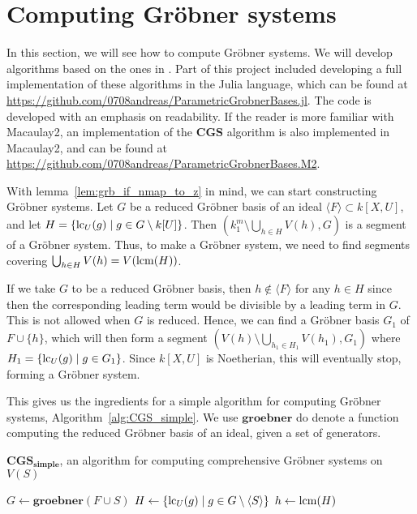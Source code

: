 \section{Computing Gröbner systems}
In this section, we will see how to compute Gröbner systems. We will develop algorithms based on the ones in \cite{ss_algo}. Part of this project included developing a full implementation of these algorithms in the Julia language, which can be found at \url{https://github.com/0708andreas/ParametricGrobnerBases.jl}. The code is developed with an emphasis on readability. If the reader is more familiar with Macaulay2, an implementation of the $\mathbf{CGS}$ algorithm is also implemented in Macaulay2, and can be found at \url{https://github.com/0708andreas/ParametricGrobnerBases.M2}.

With lemma~\ref{lem:grb_if_nmap_to_z} in mind, we can start constructing Gröbner systems. Let $G$ be a reduced Gröbner basis of an ideal $\langle F \rangle \subset k[X, U]$, and let $H = \{\operatorname{lc}_{U}(g) \mid g \in G \setminus k[U]\}$. Then $\left(k_{1}^{m} \setminus \bigcup_{h \in H} V(h), G\right)$ is a segment of a Gröbner system. Thus, to make a Gröbner system, we need to find segments covering $\bigcup_{h \in H} V(h) = V(\operatorname{lcm}(H))$.

If we take $G$ to be a reduced Gröbner basis, then $h \notin \langle F \rangle$ for any $h \in H$ since then the corresponding leading term would be divisible by a leading term in $G$. This is not allowed when $G$ is reduced. Hence, we can find a Gröbner basis $G_{1}$ of $F \cup \{h\}$, which will then form a segment $(V(h) \setminus \bigcup_{h_{1} \in H_{1}} V(h_{1}), G_{1})$ where $H_{1} = \{\operatorname{lc}_{U}(g) \mid g \in G_{1}\}$. Since $k[X, U]$ is Noetherian, this will eventually stop, forming a Gröbner system.

This gives us the ingredients for a simple algorithm for computing Gröbner systems, Algorithm~\ref{alg:CGS_simple}. We use $\mathbf{groebner}$ do denote a function computing the reduced Gröbner basis of an ideal, given a set of generators.

\begin{algorithm}
  \caption{$\mathbf{CGS_{simple}}$, an algorithm for computing comprehensive Gröbner systems on $V(S)$}%
  \label{alg:CGS_simple}
    {
    \KwRet{\emptyset}\;
  } {
    $G \gets \mathbf{groebner}(F \cup S)$\;
    $H \gets \{\operatorname{lc}_{U}(g) \mid g \in G \setminus \langle S \rangle\}$\;
    $h \gets \operatorname{lcm}(H)$\;
  }
\end{algorithm}

